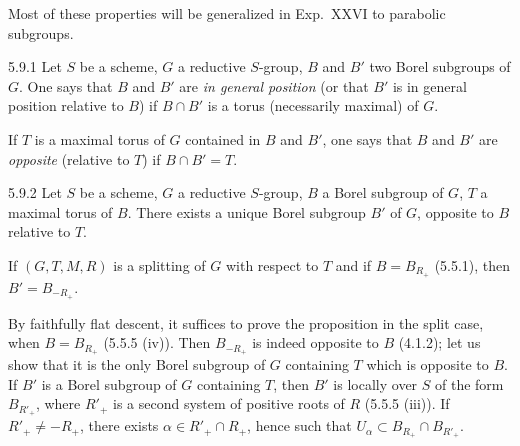 Most of these properties will be generalized in Exp.~XXVI to parabolic subgroups.
\begin{definition}{5.9.1}\label{XXII.5.9.1}
Let $S$ be a scheme, $G$ a reductive $S$-group, $B$ and $B'$ two Borel subgroups of $G$. One says that $B$ and $B'$ are \emph{in general position} (or that $B'$ is in general position relative to $B$) if $B\cap B'$ is a torus (necessarily maximal) of $G$.

If $T$ is a maximal torus of $G$ contained in $B$ and $B'$, one says that $B$ and $B'$ are \emph{opposite} (relative to $T$) if $B\cap B'=T$.
\end{definition}
\begin{proposition}{5.9.2}\label{XXII.5.9.2}
Let $S$ be a scheme, $G$ a reductive $S$-group, $B$ a Borel subgroup of $G$, $T$ a maximal torus of $B$. There exists a unique Borel subgroup $B'$ of $G$, opposite to $B$ relative to $T$.

If $(G,T,M,R)$ is a splitting of $G$ with respect to $T$ and if $B=B_{R_+}$ (5.5.1), then $B'=B_{-R_+}$.
\end{proposition}
By faithfully flat descent, it suffices to prove the proposition in the split case, when $B=B_{R_+}$ (5.5.5 (iv)). Then $B_{-R_+}$ is indeed opposite to $B$ (4.1.2); let us show that it is the only Borel subgroup of $G$ containing $T$ which is opposite to $B$. If $B'$ is a Borel subgroup of $G$ containing $T$, then $B'$ is locally over $S$ of the form $B_{R'_+}$, where $R'_+$ is a second system of positive roots of $R$ (5.5.5 (iii)). If $R'_+\ne-R_+$, there exists $\alpha\in R'_+\cap R_+$, hence such that $U_\alpha\subset B_{R_+}\cap B_{R'_+}$.
